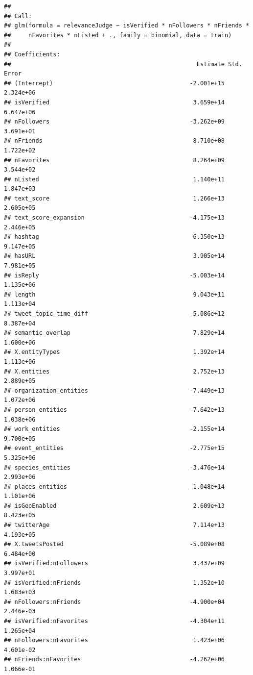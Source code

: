 \documentclass[
]{article}
\begin{document}
\begin{verbatim}
## 
## Call:
## glm(formula = relevanceJudge ~ isVerified * nFollowers * nFriends * 
##     nFavorites * nListed + ., family = binomial, data = train)
## 
## Coefficients:
##                                                     Estimate Std. Error
## (Intercept)                                       -2.001e+15  2.324e+06
## isVerified                                         3.659e+14  6.647e+06
## nFollowers                                        -3.262e+09  3.691e+01
## nFriends                                           8.710e+08  1.722e+02
## nFavorites                                         8.264e+09  3.544e+02
## nListed                                            1.140e+11  1.847e+03
## text_score                                         1.266e+13  2.605e+05
## text_score_expansion                              -4.175e+13  2.446e+05
## hashtag                                            6.350e+13  9.147e+05
## hasURL                                             3.905e+14  7.981e+05
## isReply                                           -5.003e+14  1.135e+06
## length                                             9.043e+11  1.113e+04
## tweet_topic_time_diff                             -5.086e+12  8.387e+04
## semantic_overlap                                   7.829e+14  1.600e+06
## X.entityTypes                                      1.392e+14  1.113e+06
## X.entities                                         2.752e+13  2.889e+05
## organization_entities                             -7.449e+13  1.072e+06
## person_entities                                   -7.642e+13  1.038e+06
## work_entities                                     -2.155e+14  9.700e+05
## event_entities                                    -2.775e+15  5.325e+06
## species_entities                                  -3.476e+14  2.993e+06
## places_entities                                   -1.048e+14  1.101e+06
## isGeoEnabled                                       2.609e+13  8.423e+05
## twitterAge                                         7.114e+13  4.193e+05
## X.tweetsPosted                                    -5.089e+08  6.484e+00
## isVerified:nFollowers                              3.437e+09  3.997e+01
## isVerified:nFriends                                1.352e+10  1.683e+03
## nFollowers:nFriends                               -4.900e+04  2.446e-03
## isVerified:nFavorites                             -4.304e+11  1.265e+04
## nFollowers:nFavorites                              1.423e+06  4.601e-02
## nFriends:nFavorites                               -4.262e+06  1.066e-01

\end{verbatim}
\end{document}
